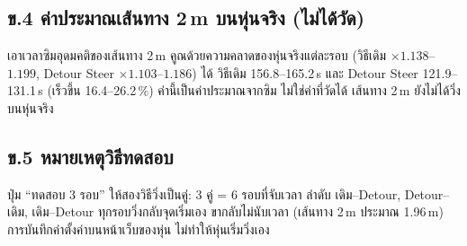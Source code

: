 \documentclass[11pt,a4paper]{article}
\begin{document}
\subsection*{ข.4 ค่าประมาณเส้นทาง 2\,m บนหุ่นจริง (ไม่ได้วัด)}
เอาเวลาซิมอุดมคติของเส้นทาง 2\,m คูณด้วยความคลาดของหุ่นจริงแต่ละรอบ (วิธีเดิม $\times 1.138$--$1.199$,
Detour Steer $\times 1.103$--$1.186$) ได้ วิธีเดิม 156.8--165.2\,s และ Detour Steer 121.9--131.1\,s
(เร็วขึ้น 16.4--26.2\,\%) ค่านี้เป็นค่าประมาณจากซิม ไม่ใช่ค่าที่วัดได้ เส้นทาง 2\,m ยังไม่ได้วิ่งบนหุ่นจริง

\subsection*{ข.5 หมายเหตุวิธีทดสอบ}
ปุ่ม ``ทดสอบ 3 รอบ'' ให้สองวิธีวิ่งเป็นคู่: 3 คู่ = 6 รอบที่จับเวลา ลำดับ เดิม--Detour, Detour--เดิม, เดิม--Detour
ทุกรอบวิ่งกลับจุดเริ่มเอง ขากลับไม่นับเวลา (เส้นทาง 2\,m ประมาณ 1.96\,m) การบันทึกค่าตั้งค่าบนหน้าเว็บของหุ่น
ไม่ทำให้หุ่นเริ่มวิ่งเอง
\end{document}
